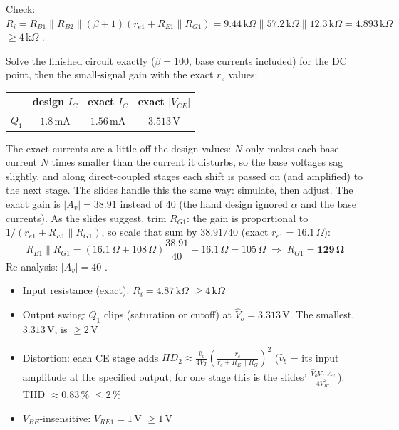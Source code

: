 \documentclass[11pt]{article}
\newcommand{\solstep}[2]{\par\medskip{\color{stepc}\textbf{Step #1 --- #2}}\par\nopagebreak}
\begin{document}
Check: $R_i = R_{B1}\|R_{B2}\|(\beta+1)(r_{e1} + R_{E1}\|R_{G1}) = 9.44\,\mathrm{k}\Omega\|57.2\,\mathrm{k}\Omega\|12.3\,\mathrm{k}\Omega = 4.893\,\mathrm{k}\Omega$ $\ge 4\,\mathrm{k}\Omega$ \checkmark.
\solstep{4}{Check by analysis}Solve the finished circuit exactly ($\beta=100$, base currents included) for the DC point, then the small-signal gain with the exact $r_e$ values:\begin{center}\renewcommand{\arraystretch}{1.35}
\begin{tabular}{cccc}
\toprule
 & design $I_C$ & exact $I_C$ & exact $|V_{CE}|$ \\
\midrule
$Q_{1}$ & $1.8\,\mathrm{m}\mathrm{A}$ & $1.56\,\mathrm{m}\mathrm{A}$ & $3.513\,\mathrm{V}$ \\
\bottomrule
\end{tabular}\end{center}
The exact currents are a little off the design values: $N$ only makes each base current $N$ times smaller than the current it disturbs, so the base voltages sag slightly, and along direct-coupled stages each shift is passed on (and amplified) to the next stage. The slides handle this the same way: simulate, then adjust. The exact gain is $|A_v| = 38.91$ instead of $40$ (the hand design ignored $\alpha$ and the base currents). As the slides suggest, trim $R_{G1}$: the gain is proportional to $1/(r_{e1} + R_{E1}\|R_{G1})$, so scale that sum by $38.91/40$ (exact $r_{e1} = 16.1\,\Omega$):\[R_{E1}\|R_{G1} = (16.1\,\Omega + 108\,\Omega)\frac{38.91}{40} - 16.1\,\Omega = 105\,\Omega \;\Rightarrow\; R_{G1} = \mathbf{129\,\Omega}\]Re-analysis: $|A_v| = 40$ \checkmark. \begin{itemize}[leftmargin=*,itemsep=2pt]
\item Input resistance (exact): $R_i = 4.87\,\mathrm{k}\Omega$ $\ge 4\,\mathrm{k}\Omega$ \checkmark
\item Output swing: $Q_{1}$ clips (saturation or cutoff) at $\hat V_o = 3.313\,\mathrm{V}$. The smallest, $3.313\,\mathrm{V}$, is $\ge 2$\,V \checkmark
\item Distortion: each CE stage adds $HD_2 \approx \frac{\hat v_b}{4V_T}\left(\frac{r_e}{r_e + R_E\|R_G}\right)^2$ ($\hat v_b$ = its input amplitude at the specified output; for one stage this is the slides' $\frac{\hat V_o V_T |A_v|}{4V_{RC}^2}$): THD $\approx 0.83\,\%$ $\le 2\,\%$ \checkmark
\item $V_{BE}$-insensitive: $V_{RE1} = 1$\,V $\ge 1$\,V \checkmark
\end{itemize}
\end{document}
